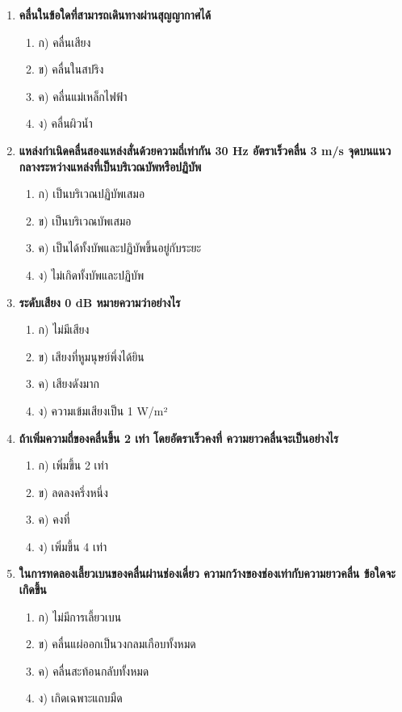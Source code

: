 \documentclass[12pt]{article}
\begin{document}
\begin{enumerate}
\begin{enumerate}
\item ค) 3 × 10⁴ m/s
\item ง) 3 × 10⁷ m/s
\end{enumerate}
\item \textbf{คลื่นในข้อใดที่สามารถเดินทางผ่านสุญญากาศได้}
\begin{enumerate}
\item ก) คลื่นเสียง
\item ข) คลื่นในสปริง
\item ค) คลื่นแม่เหล็กไฟฟ้า
\item ง) คลื่นผิวน้ำ
\end{enumerate}
\item \textbf{แหล่งกำเนิดคลื่นสองแหล่งสั่นด้วยความถี่เท่ากัน 30 Hz อัตราเร็วคลื่น 3 m/s จุดบนแนวกลางระหว่างแหล่งที่เป็นบริเวณบัพหรือปฏิบัพ}
\begin{enumerate}
\item ก) เป็นบริเวณปฏิบัพเสมอ
\item ข) เป็นบริเวณบัพเสมอ
\item ค) เป็นได้ทั้งบัพและปฏิบัพขึ้นอยู่กับระยะ
\item ง) ไม่เกิดทั้งบัพและปฏิบัพ
\end{enumerate}
\item \textbf{ระดับเสียง 0 dB หมายความว่าอย่างไร}
\begin{enumerate}
\item ก) ไม่มีเสียง
\item ข) เสียงที่หูมนุษย์พึ่งได้ยิน
\item ค) เสียงดังมาก
\item ง) ความเข้มเสียงเป็น 1 W/m²
\end{enumerate}
\item \textbf{ถ้าเพิ่มความถี่ของคลื่นขึ้น 2 เท่า โดยอัตราเร็วคงที่ ความยาวคลื่นจะเป็นอย่างไร}
\begin{enumerate}
\item ก) เพิ่มขึ้น 2 เท่า
\item ข) ลดลงครึ่งหนึ่ง
\item ค) คงที่
\item ง) เพิ่มขึ้น 4 เท่า
\end{enumerate}
\item \textbf{ในการทดลองเลี้ยวเบนของคลื่นผ่านช่องเดี่ยว ความกว้างของช่องเท่ากับความยาวคลื่น ข้อใดจะเกิดขึ้น}
\begin{enumerate}
\item ก) ไม่มีการเลี้ยวเบน
\item ข) คลื่นแผ่ออกเป็นวงกลมเกือบทั้งหมด
\item ค) คลื่นสะท้อนกลับทั้งหมด
\item ง) เกิดเฉพาะแถบมืด
\end{enumerate}
\end{enumerate}
\end{document}
